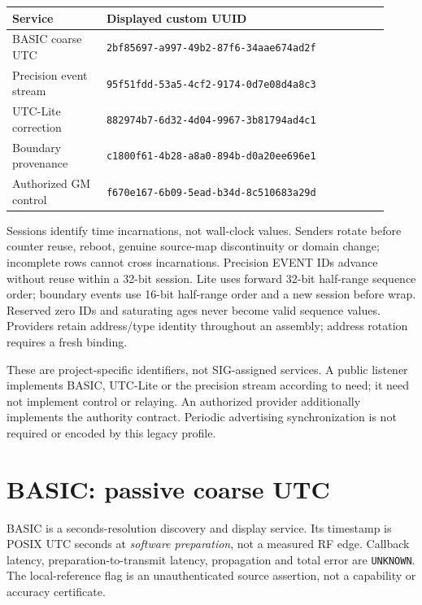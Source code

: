 \documentclass[11pt,letterpaper]{article}
\newcommand{\page}{\clearpage}
\newcommand{\unknown}{\texttt{UNKNOWN}}
\begin{document}
\begin{center}\small
\begin{tabular}{@{}L{0.23\linewidth}L{0.69\linewidth}@{}}\toprule
Service & Displayed custom UUID \\\midrule
BASIC coarse UTC & \texttt{2bf85697-a997-49b2-87f6-34aae674ad2f} \\
Precision event stream & \texttt{95f51fdd-53a5-4cf2-9174-0d7e08d4a8c3} \\
UTC-Lite correction & \texttt{882974b7-6d32-4d04-9967-3b81794ad4c1} \\
Boundary provenance & \texttt{c1800f61-4b28-a8a0-894b-d0a20ee696e1} \\
Authorized GM control & \texttt{f670e167-6b09-5ead-b34d-8c510683a29d} \\\bottomrule
\end{tabular}
\end{center}
Sessions identify time incarnations, not wall-clock values. Senders rotate before counter reuse, reboot, genuine source-map discontinuity or domain change; incomplete rows cannot cross incarnations. Precision EVENT IDs advance without reuse within a 32-bit session. Lite uses forward 32-bit half-range sequence order; boundary events use 16-bit half-range order and a new session before wrap. Reserved zero IDs and saturating ages never become valid sequence values. Providers retain address/type identity throughout an assembly; address rotation requires a fresh binding.

These are project-specific identifiers, not SIG-assigned services. A public listener implements BASIC, UTC-Lite or the precision stream according to need; it need not implement control or relaying. An authorized provider additionally implements the authority contract. Periodic advertising synchronization is not required or encoded by this legacy profile.

\page
\section{BASIC: passive coarse UTC}\label{sec:basic}
BASIC is a seconds-resolution discovery and display service. Its timestamp is POSIX UTC seconds at \emph{software preparation}, not a measured RF edge. Callback latency, preparation-to-transmit latency, propagation and total error are \unknown. The local-reference flag is an unauthenticated source assertion, not a capability or accuracy certificate.
\end{document}
